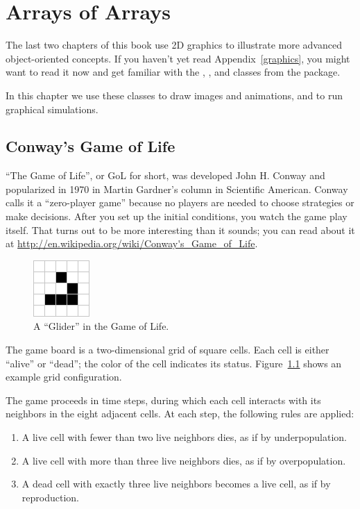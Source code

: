 \chapter{Arrays of Arrays}
\label{conway}

The last two chapters of this book use 2D graphics to illustrate more advanced object-oriented concepts.
If you haven't yet read Appendix~\ref{graphics}, you might want to read it now and get familiar with the , , and  classes from the  package.

In this chapter we use these classes to draw images and animations, and to run graphical simulations.


\section{Conway's Game of Life}

``The Game of Life'', or GoL for short, was developed John H. Conway and popularized in 1970 in Martin Gardner's column in Scientific American.
Conway calls it a ``zero-player game'' because no players are needed to choose strategies or make decisions.
After you set up the initial conditions, you watch the game play itself.
That turns out to be more interesting than it sounds; you can read about it at \url{http://en.wikipedia.org/wiki/Conway's_Game_of_Life}.

\begin{figure}[!ht]
\begin{center}
\includegraphics{figs/glider.png}
\caption{A ``Glider'' in the Game of Life.}
\label{fig:glider}
\end{center}
\end{figure}

The game board is a two-dimensional grid of square cells.
Each cell is either ``alive'' or ``dead''; the color of the cell indicates its status.
Figure~\ref{fig:glider} shows an example grid configuration.


The game proceeds in time steps, during which each cell interacts with its neighbors in the eight adjacent cells.
At each step, the following rules are applied:

\begin{enumerate}
\item A live cell with fewer than two live neighbors dies, as if by underpopulation.
\item A live cell with more than three live neighbors dies, as if by overpopulation.
\item A dead cell with exactly three live neighbors becomes a live cell, as if by reproduction.
\end{enumerate}

